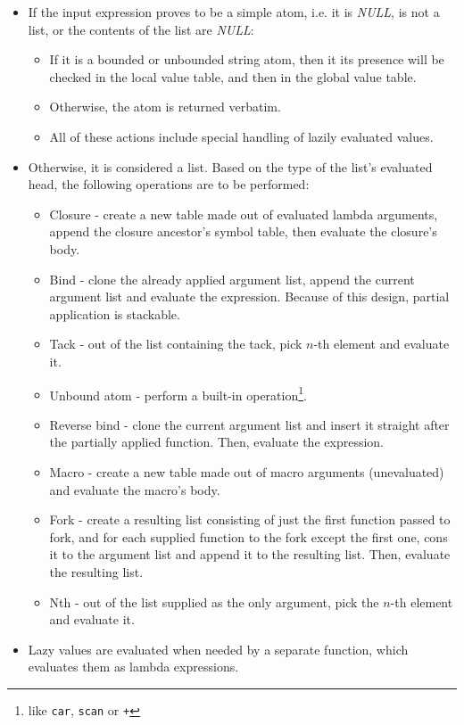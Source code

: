 \begin{itemize}
    \item If the input expression proves to be a simple atom, i.e. it is \textit{NULL}, is not a list, or the contents of the list are \textit{NULL}:
    \begin{itemize}
        \item If it is a bounded or unbounded string atom, then it its presence will be checked in the local value table, and then in the global value table.
        \item Otherwise, the atom is returned verbatim.
        \item All of these actions include special handling of lazily evaluated values.
    \end{itemize}
    \item Otherwise, it is considered a list. Based on the type of the list's evaluated head, the following operations are to be performed:
    \begin{itemize}
        \item Closure - create a new table made out of evaluated lambda arguments, append the closure ancestor's symbol table, then evaluate the closure's body.
        \item Bind - clone the already applied argument list, append the current argument list and evaluate the expression. Because of this design, partial application is stackable.
        \item Tack - out of the list containing the tack, pick $n$-th element and evaluate it.
        \item Unbound atom - perform a built-in operation\footnote{like \verb|car|, \verb|scan| or \verb|+|}.
        \item Reverse bind - clone the current argument list and insert it straight after the partially applied function. Then, evaluate the expression.
        \item Macro - create a new table made out of macro arguments (unevaluated) and evaluate the macro's body.
        \item Fork - create a resulting list consisting of just the first function passed to fork, and for each supplied function to the fork except the first one, cons it to the argument list and append it to the resulting list. Then, evaluate the resulting list.
        \item Nth - out of the list supplied as the only argument, pick the $n$-th element and evaluate it.
    \end{itemize}
    \item Lazy values are evaluated when needed by a separate function, which evaluates them as lambda expressions.
\end{itemize}

